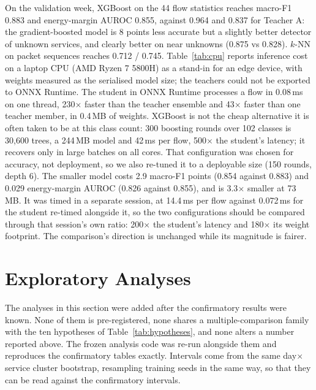 \documentclass[journal]{IEEEtran}
\begin{document}
On the validation week, XGBoost on the 44 flow statistics reaches macro-F1 0.883 and energy-margin AUROC 0.855, against 0.964 and 0.837 for Teacher A: the gradient-boosted model is 8 points less accurate but a slightly better detector of unknown services, and clearly better on near unknowns (0.875 vs 0.828). $k$-NN on packet sequences reaches 0.712 / 0.745. Table~\ref{tab:cpu} reports inference cost on a laptop CPU (AMD Ryzen 7 5800H) as a stand-in for an edge device, with weights measured as the serialised model size; the teachers could not be exported to ONNX Runtime. The student in ONNX Runtime processes a flow in 0.08\,ms on one thread, 230$\times$ faster than the teacher ensemble and 43$\times$ faster than one teacher member, in 0.4\,MB of weights. XGBoost is not the cheap alternative it is often taken to be at this class count: 300 boosting rounds over 102 classes is 30,600 trees, a 244\,MB model and 42\,ms per flow, 500$\times$ the student's latency; it recovers only in large batches on all cores. That configuration was chosen for accuracy, not deployment, so we also re-tuned it to a deployable size (150 rounds, depth 6). The smaller model costs 2.9 macro-F1 points (0.854 against 0.883) and 0.029 energy-margin AUROC (0.826 against 0.855), and is 3.3$\times$ smaller at 73\,MB. It was timed in a separate session, at 14.4\,ms per flow against 0.072\,ms for the student re-timed alongside it, so the two configurations should be compared through that session's own ratio: 200$\times$ the student's latency and 180$\times$ its weight footprint. The comparison's direction is unchanged while its magnitude is fairer.



\section{Exploratory Analyses}
\label{sec:exploratory}

The analyses in this section were added after the confirmatory results were known. None of them is pre-registered, none shares a multiple-comparison family with the ten hypotheses of Table~\ref{tab:hypotheses}, and none alters a number reported above. The frozen analysis code was re-run alongside them and reproduces the confirmatory tables exactly. Intervals come from the same day$\times$service cluster bootstrap, resampling training seeds in the same way, so that they can be read against the confirmatory intervals.


\end{document}
